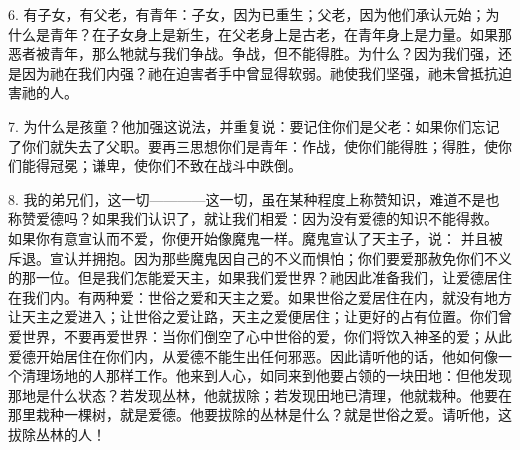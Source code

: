 6. 有子女，有父老，有青年：子女，因为已重生；父老，因为他们承认元始；为什么是青年？在子女身上是新生，在父老身上是古老，在青年身上是力量。如果那恶者被青年，那么牠就与我们争战。争战，但不能得胜。为什么？因为我们强，还是因为祂在我们内强？祂在迫害者手中曾显得软弱。祂使我们坚强，祂未曾抵抗迫害祂的人。\par

7.  为什么是孩童？他加强这说法，并重复说：要记住你们是父老：如果你们忘记了你们就失去了父职。要再三思想你们是青年：作战，使你们能得胜；得胜，使你们能得冠冕；谦卑，使你们不致在战斗中跌倒。\par

8. 我的弟兄们，这一切————这一切，虽在某种程度上称赞知识，难道不是也称赞爱德吗？如果我们认识了，就让我们相爱：因为没有爱德的知识不能得救。 如果你有意宣认而不爱，你便开始像魔鬼一样。魔鬼宣认了天主子，说： 并且被斥退。宣认并拥抱。因为那些魔鬼因自己的不义而惧怕；你们要爱那赦免你们不义的那一位。但是我们怎能爱天主，如果我们爱世界？祂因此准备我们，让爱德居住在我们内。有两种爱：世俗之爱和天主之爱。如果世俗之爱居住在内，就没有地方让天主之爱进入；让世俗之爱让路，天主之爱便居住；让更好的占有位置。你们曾爱世界，不要再爱世界：当你们倒空了心中世俗的爱，你们将饮入神圣的爱；从此爱德开始居住在你们内，从爱德不能生出任何邪恶。因此请听他的话，他如何像一个清理场地的人那样工作。他来到人心，如同来到他要占领的一块田地：但他发现那地是什么状态？若发现丛林，他就拔除；若发现田地已清理，他就栽种。他要在那里栽种一棵树，就是爱德。他要拔除的丛林是什么？就是世俗之爱。请听他，这拔除丛林的人！\par

